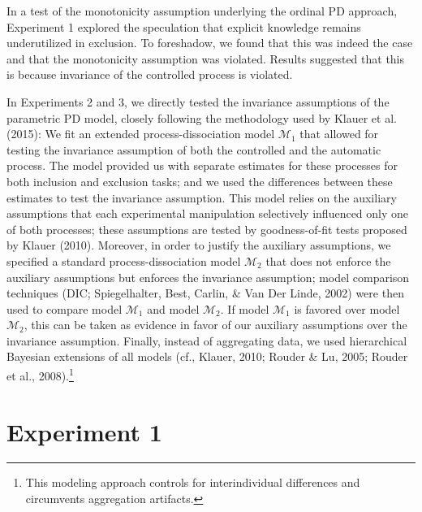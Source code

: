 \documentclass[man]{apa6}
\theoremstyle{definition}
\theoremstyle{definition}
\theoremstyle{definition}
\theoremstyle{remark}
\begin{document}
In a test of the monotonicity assumption underlying the ordinal PD
approach, Experiment 1 explored the speculation that explicit knowledge
remains underutilized in exclusion. To foreshadow, we found that this
was indeed the case and that the monotonicity assumption was violated.
Results suggested that this is because invariance of the controlled
process is violated.

In Experiments 2 and 3, we directly tested the invariance assumptions of
the parametric PD model, closely following the methodology used by
Klauer et al. (2015): We fit an extended process-dissociation model
\(\mathcal{M}_1\) that allowed for testing the invariance assumption of
both the controlled and the automatic process. The model provided us
with separate estimates for these processes for both inclusion and
exclusion tasks; and we used the differences between these estimates to
test the invariance assumption. This model relies on the auxiliary
assumptions that each experimental manipulation selectively influenced
only one of both processes; these assumptions are tested by
goodness-of-fit tests proposed by Klauer (2010). Moreover, in order to
justify the auxiliary assumptions, we specified a standard
process-dissociation model \(\mathcal{M}_2\) that does not enforce the
auxiliary assumptions but enforces the invariance assumption; model
comparison techniques (DIC; Spiegelhalter, Best, Carlin, \& Van Der
Linde, 2002) were then used to compare model \(\mathcal{M}_1\) and model
\(\mathcal{M}_2\). If model \(\mathcal{M}_1\) is favored over model
\(\mathcal{M}_2\), this can be taken as evidence in favor of our
auxiliary assumptions over the invariance assumption. Finally, instead
of aggregating data, we used hierarchical Bayesian extensions of all
models (cf., Klauer, 2010; Rouder \& Lu, 2005; Rouder et al.,
2008).\footnote{This modeling approach controls for interindividual
  differences and circumvents aggregation artifacts.}

\section{Experiment 1}\label{experiment-1}
\end{document}
